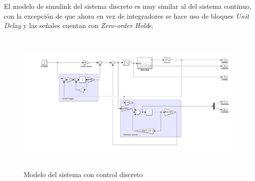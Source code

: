 \documentclass[a4paper, 12pt]{article}
\begin{document}
El modelo de simulink del sistema discreto es muy similar al del sistema continuo, con la excepción de que ahora en vez de integradores se hace uso de bloques \textit{Unit Delay} y las señales cuentan con \textit{Zero-order Hold}s.
\begin{figure}[H]
	\centering
	\includegraphics*[height = 7cm]{figs/p5/discreto}
	\caption{Modelo del sistema con control discreto}
\end{figure}
\end{document}
